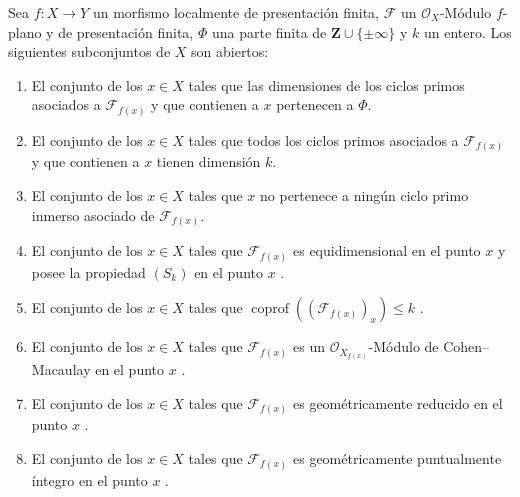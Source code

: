 \begin{theorem}[12.1.1]
\label{IV.12.1.1}
Sea $f:X\to Y$ un morfismo localmente de presentación finita, $\mathcal F$ un $\mathcal O_X$-Módulo $f$-plano y de presentación finita, $\Phi$ una parte finita de $\mathbf Z\cup\{\pm\infty\}$ y $k$ un entero.
Los siguientes subconjuntos de $X$ son abiertos:
\begin{enumerate}[label=\textup{(\roman*)}]
  \item El conjunto de los $x\in X$ tales que las dimensiones de los ciclos primos asociados a $\mathcal F_{f(x)}$ y que contienen a $x$ pertenecen a $\Phi$.
  \item El conjunto de los $x\in X$ tales que todos los ciclos primos asociados a $\mathcal F_{f(x)}$ y que contienen a $x$ tienen dimensión $k$.
  \item El conjunto de los $x\in X$ tales que $x$ no pertenece a ningún ciclo primo inmerso asociado de $\mathcal F_{f(x)}$.
  \item El conjunto de los $x\in X$ tales que $\mathcal F_{f(x)}$ es \textup{equidimensional} en el punto $x$ y posee la propiedad $(S_k)$ en el punto $x$ .
  \item El conjunto de los $x\in X$ tales que $\operatorname{coprof}((\mathcal F_{f(x)})_x)\leq k$ .
  \item El conjunto de los $x\in X$ tales que $\mathcal F_{f(x)}$ es un $\mathcal O_{X_{f(x)}}$-Módulo de Cohen--Macaulay en el punto $x$ .
  \item El conjunto de los $x\in X$ tales que $\mathcal F_{f(x)}$ es geométricamente reducido en el punto $x$ .
  \item El conjunto de los $x\in X$ tales que $\mathcal F_{f(x)}$ es geométricamente puntualmente íntegro en el punto $x$ .
\end{enumerate}

\end{theorem}

